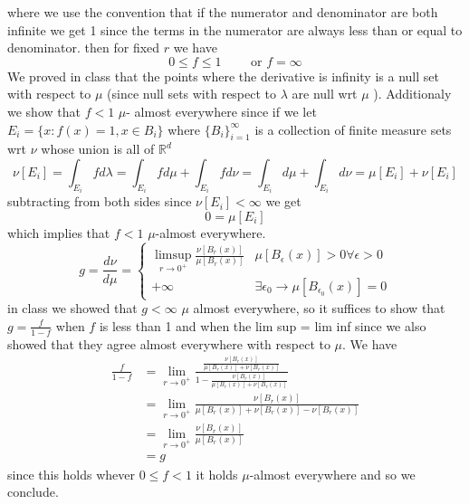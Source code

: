\documentclass[11pt]{article}
\begin{document}
{\[    \] 
    where we use the convention that if the numerator and denominator are both infinite we get 1 since the terms in the numerator are always less than or equal to denominator.
    then for fixed $r$ we have 
    \[
        0 \le f \le 1 \qquad \text{ or } f = \infty
    \] 
    We proved in class that the points where the derivative is infinity is a null set with respect to $\mu$ (since null sets with respect to $\lambda$ are null wrt $\mu $ ).
    Additionaly we show that $f < 1$  $\mu$- almost everywhere since if we let $E_i = \{x : f(x) = 1, x \in B_i\}$ where  $\{B_i\}_{i=1}^{\infty}$ is a collection of finite measure sets wrt $\nu$ whose union is all of $ \mathbb{R}^{d}$
    \[
        \nu[E_i] = \int_{E_i}^{}f d\lambda = \int_{E_i}^{}f d \mu + \int_{ E_i}^{} f d \nu = \int_{E_i}^{} d \mu + \int_{E_i}^{} d \nu = \mu[E_i] + \nu[E_i]
    \] 
    subtracting from both sides since $\nu[E_i] < \infty$ we get
    \[
        0 = \mu[E_i]
    \] 
    which implies that $f < 1$  $\mu$-almost everywhere. 
    \[
    g = \frac{d \nu}{d \mu} =
    \begin{cases}
        \limsup_{r\to 0^{+}}\frac{\nu[B_r(x)]}{\mu[B_r(x)]} & \mu[B_\epsilon(x)] > 0 \forall \epsilon > 0\\
        +\infty & \exists \epsilon_0 \rightarrow \mu[B_{\epsilon_0}(x)] = 0
    \end{cases}
    \] 
    in class we showed that $g < \infty$  $\mu$ almost everywhere, so it suffices to show that $g = \frac{f}{1-f}$ when $f$ is less than 1 and when the lim sup = lim inf since we also showed that they agree almost everywhere with respect to $\mu$.
    We have
    \begin{align*}
        \frac{f}{1-f} &= \lim_{r\to 0^{+}} \frac{\frac{\nu[B_r(x)]}{\mu[B_r(x)] + \nu[B_r(x)]}}{1 - \frac{\nu[B_r(x)]}{\mu[B_r(x)] + \nu[B_r(x)]}}\\
                      &= \lim_{r\to 0^{+}}\frac{\nu[B_r(x)]}{\mu[B_r(x)] + \nu[B_r(x)] - \nu[B_r(x)]} \\
                      &= \lim_{r\to 0^{+}} \frac{\nu[B_r(x)]}{\mu[B_r(x)]}\\
                      &= g
    \end{align*}
    since this holds whever $0 \le f < 1$ it holds $\mu$-almost everywhere and so we conclude.
}
\end{document}
